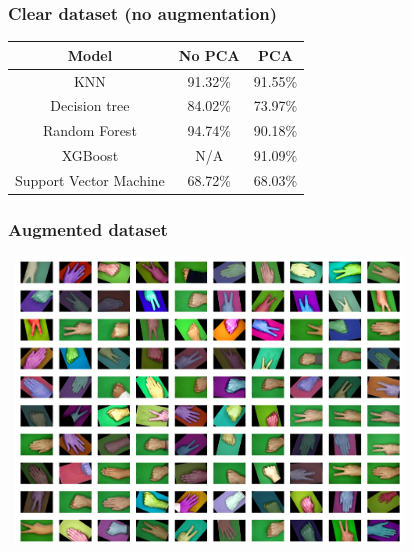 \documentclass{beamer}
\begin{document}









\begin{frame}
  \frametitle{Clear dataset (no augmentation)}

  \begin{table}
    \centering
    \begin{tabular}{|c|c|c|}
      \hline
      \textbf{Model} & \textbf{No PCA} & \textbf{PCA} \\
      \hline
      KNN & 91.32\% & 91.55\% \\
      \hline
      Decision tree & 84.02\% & 73.97\% \\
      \hline
      Random Forest & 94.74\% & 90.18\% \\
      \hline
      XGBoost & N/A & 91.09\% \\
      \hline
      Support Vector Machine & 68.72\% & 68.03\% \\
      \hline
    \end{tabular}
  \end{table}

\end{frame}

\begin{frame}
  \frametitle{Augmented dataset}
\centering
\includegraphics[height=3in, width=4.2in]{images/augmented.png}
\end{frame}
\end{document}
